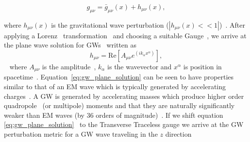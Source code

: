 \begin{equation}
    g_{\mu \nu} = \bar{g}_{\mu \nu}(x) + h_{\mu \nu}(x),
\end{equation}{}

where $h_{\mu \nu}(x)$ is the gravitational wave perturbation ($|h_{\mu \nu}(x) << 1|$)~. After applying a Lorenz~ transformation~ and choosing a suitable Gauge~, we  arrive at the plane wave solution for \ac{GW}s~ written as
%
\begin{equation}\label{eq:gw_plane_solution}
    h_{\mu\nu} = \textrm{Re}[A_{\mu\nu} e^{(ik_{\alpha}x^{\alpha})}],
\end{equation}{}
%
~
where $A_{\mu\nu}$ is the amplitude~, $k_{\alpha}$ is the  wavevector and $x^{\alpha}$ is 
position in spacetime~. Equation~\ref{eq:gw_plane_solution} can be seen to have 
properties similar to that of an \ac{EM} wave which is typically generated by 
accelerating charges~. A \ac{GW} is generated by accelerating masses which produce 
higher order quadropole~ (or multipole) moments and that they are naturally significantly 
weaker than \ac{EM} waves (by 36 orders of magnitude)~. If we shift 
equation \ref{eq:gw_plane_solution}~ to the Transverse Traceless gauge 
we arrive at the \ac{GW} perturbation metric for a \ac{GW} wave traveling in the 
$z$ direction

